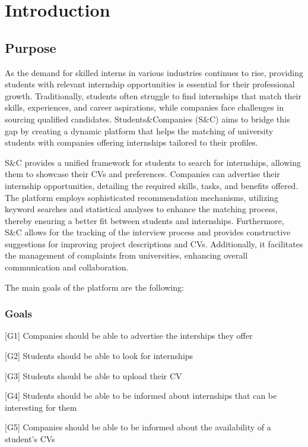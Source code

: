 \chapter{Introduction}

\section{Purpose}
As the demand for skilled interns in various industries continues to rise, providing students with relevant internship opportunities is essential for their professional growth. 
Traditionally, students often struggle to find internships that match their skills, experiences, and career aspirations, while companies face challenges in sourcing qualified candidates. 
Students\&Companies (S\&C) aims to bridge this gap by creating a dynamic platform that helps the matching of university students with companies offering internships tailored to their profiles.

S\&C provides a unified framework for students to search for internships, allowing them to showcase their CVs and preferences. 
Companies can advertise their internship opportunities, detailing the required skills, tasks, and benefits offered.
The platform employs sophisticated recommendation mechanisms, utilizing keyword searches and statistical analyses to enhance the matching process, thereby ensuring a better fit between students and internships.
Furthermore, S\&C allows for the tracking of the interview process and provides constructive suggestions for improving project descriptions and CVs. Additionally, it facilitates the management of complaints from universities, enhancing overall communication and collaboration. 

The main goals of the platform are the following:

\subsection{Goals}

[G1] Companies should be able to advertise the interships they offer 

[G2] Students should be able to look for internships

[G3] Students should be able to upload their CV  

[G4] Students should be able to be informed about internships that can be interesting for them 

[G5] Companies should be able to be informed about the availability of a student's CVs 

